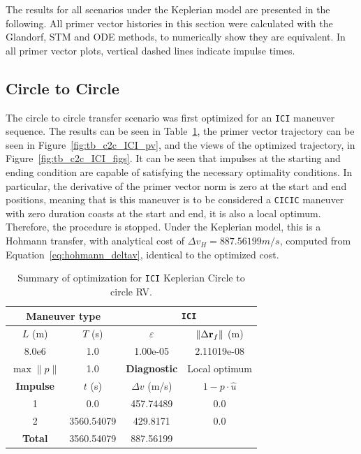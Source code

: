 The results for all scenarios under the Keplerian model are presented in the following. All primer vector histories in this section were calculated with the Glandorf, STM and ODE methods, to numerically show they are equivalent. In all primer vector plots, vertical dashed lines indicate impulse times.

\subsection{Circle to Circle}

The circle to circle transfer scenario was first optimized for an \texttt{ICI} maneuver sequence. The results can be seen in Table~\ref{tab:tb_ctcr_ICI_tab}, the primer vector trajectory can be seen in Figure~\ref{fig:tb_c2c_ICI_pv}, and the views of the optimized trajectory, in Figure~\ref{fig:tb_c2c_ICI_figs}. It can be seen that impulses at the starting and ending condition are capable of satisfying the necessary optimality conditions. In particular, the derivative of the primer vector norm is zero at the start and end positions, meaning that is this maneuver is to be considered a \texttt{CICIC} maneuver with zero duration coasts at the start and end, it is also a local optimum. Therefore, the procedure is stopped. Under the Keplerian model, this is a Hohmann transfer, with analytical cost of \(\Delta v_H = 887.56199 m/s\), computed from Equation~\eqref{eq:hohmann_deltav}, identical to the optimized cost.

\begin{table}[htpb]
    \centering
    \begin{tabular}{cccc} \toprule
    \multicolumn{2}{c}{\textbf{Maneuver type}} & \multicolumn{2}{c}{\texttt{ICI}} \\ \midrule
    \(L\) (m) & \(T\) (s) & \(\varepsilon\) & \(\lVert \Delta \mathbf{r}_{f} \rVert\) (m)    \\ \midrule
    8.0e6          & 1.0          & 1.00e-05                & 2.11019e-08                        \\ \midrule
    \(\max \lVert p \rVert\) & 1.0     & \textbf{Diagnostic}   & Local optimum        \\ \midrule
    \textbf{Impulse} & \(t\) (s) & \(\Delta v\) (m/s) & \(1 - p \cdot \hat{u}\) \\ \midrule
    1                 & 0.0          & 457.74489             & 0.0                    \\
    2                 & 3560.54079          & 429.8171             & 0.0                    \\\midrule
    \textbf{Total}   & 3560.54079          & 887.56199             &                     \\ \bottomrule   
    \end{tabular}
    \caption{Summary of optimization for \texttt{ICI} Keplerian Circle to circle RV.}
    \label{tab:tb_ctcr_ICI_tab}
\end{table}

